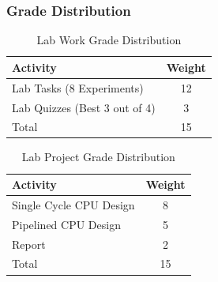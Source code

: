 \documentclass[
	11pt, %
]{beamer}
\begin{document}
\begin{frame}
	\frametitle{Grade Distribution}
	\begin{table}
		\begin{tabular}{l c}
			\toprule
			\textbf{Activity} & \textbf{Weight} \\
			\midrule
			Lab Tasks (8 Experiments)     	& 12 \\
			Lab Quizzes (Best 3 out of 4) 	& 3 \\
			\bottomrule
			Total 							& 15 \\
		\end{tabular}
		\caption{Lab Work Grade Distribution}
	\end{table}
	\begin{table}
		\begin{tabular}{l c}
			\toprule
			\textbf{Activity} & \textbf{Weight} \\
			\midrule
			Single Cycle CPU Design              &  8 \\
			Pipelined CPU Design                 &  5 \\
			Report                               &  2 \\
			\bottomrule
			Total 					             & 15 \\
		\end{tabular}
		\caption{Lab Project Grade Distribution}
	\end{table}
\end{frame}

\end{document}
